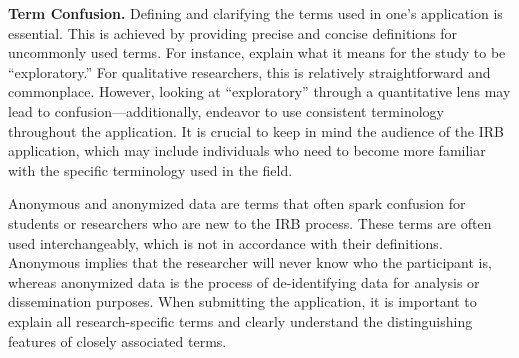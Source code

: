 \documentclass[
  11pt,
]{book}
\begin{document}
\textbf{Term Confusion.} Defining and clarifying the terms used in one's application is essential. This is achieved by providing precise and concise definitions for uncommonly used terms. For instance, explain what it means for the study to be ``exploratory.'' For qualitative researchers, this is relatively straightforward and commonplace. However, looking at ``exploratory'' through a quantitative lens may lead to confusion---additionally, endeavor to use consistent terminology throughout the application. It is crucial to keep in mind the audience of the IRB application, which may include individuals who need to become more familiar with the specific terminology used in the field.

Anonymous and anonymized data are terms that often spark confusion for students or researchers who are new to the IRB process. These terms are often used interchangeably, which is not in accordance with their definitions. Anonymous implies that the researcher will never know who the participant is, whereas anonymized data is the process of de-identifying data for analysis or dissemination purposes. When submitting the application, it is important to explain all research-specific terms and clearly understand the distinguishing features of closely associated terms.
\end{document}
